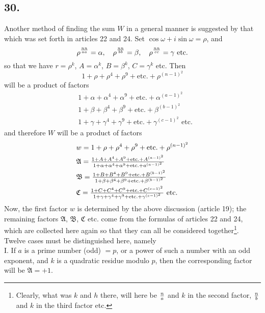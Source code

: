 \documentclass[twoside,12pt]{memoir}
\let\oldfrac\frac
\def\frac#1#2{\mathchoice{\tfrac{#1}{#2}}{\oldfrac{#1}{#2}}{\genfrac{}{}{}{2}{#1}{#2\mathstrut}}{\genfrac{}{}{}{3}{#1}{#2\mathstrut}}}
\begin{document}
\subsection*{30.}
 
Another method of finding the sum \(W\) in a general manner is suggested by that which was set forth in articles 22 and 24. Set \(\cos \omega+i \sin \omega=\rho\), and
\[\rho^{\frac{n n}{a a}}=\alpha, \quad \rho^{\frac{n n}{b b}}=\beta, \quad \rho^{\frac{n n}{c c}}=\gamma \text{ etc{.}}\]
so that we have \(r=\rho^{k}\), \(A=\alpha^{k}\), \(B=\beta^{k}\), \(C=\gamma^{k}\) etc{.} Then
\[1+\rho+\rho^{4}+\rho^{9}+\text{etc{.}}+\rho^{(n-1)^{2}}\]
will be a product of factors
\[\begin{aligned}
& 1+\alpha+\alpha^{4}+\alpha^{9}+\text{etc{.}}+\alpha^{(a-1)^{2}} \\
& 1+\beta+\beta^{4}+\beta^{9}+\text{etc{.}}+\beta^{(b-1)^{2}} \\
& 1+\gamma+\gamma^{4}+\gamma^{9}+\text{etc{.}}+\gamma^{(c-1)^{2}} \text{ etc{.}}
\end{aligned}\]\pagebreak%
and therefore \(W\) will be a product of factors
\[\begin{aligned}
& w=1+\rho+\rho^{4}+\rho^{9}+\text{etc{.}}+\rho^{(n-1)^{2}} \\
& \mathfrak{A}=\frac{1+A+A^{4}+A^{9}+\text{etc{.}}+A^{(a-1)^{2}}}{1+\alpha+\alpha^{4}+\alpha^{9}+\text{etc{.}}+a^{(a-1)^{2}}} \\
& \mathfrak{B}=\frac{1+B+B^{4}+B^{9}+\text{etc{.}}+B^{(b-1)^{2}}}{1+\beta+\beta^{4}+\beta^{9}+\text{etc{.}}+\beta^{(b-1)^2}} \\
& \mathfrak{C}=\frac{1+C+C^{4}+C^{9}+\text{etc{.}}+C^{(c-1)^{2}}}{1+\gamma+\gamma^{4}+\gamma^{9}+\text{etc{.}}+\gamma^{(c-1)^{2}}} \text{ etc{.}}
\end{aligned}\]
Now, the first factor \(w\) is determined by the above discussion (article 19); the remaining factors \(\mathfrak{A}\), \(\mathfrak{B}\), \(\mathfrak{C}\) etc{.} come from the formulas of articles 22 and 24, which are collected here again so that they can all be considered together\footnote{Clearly, what was \(k\) and \(h\) there, will here be \(\frac{n}{a}\) and \(k\) in the second factor, \(\frac{n}{b}\) and \(k\) in the third factor etc{.}}. Twelve cases must be distinguished here, namely\\
 
I. If \(a\) is a prime number (odd) \(=p\), or a power of such a number with an odd exponent, and \(k\) is a quadratic residue modulo \(p\), then the corresponding factor will be \(\mathfrak{A}=+1\).
 
\end{document}
